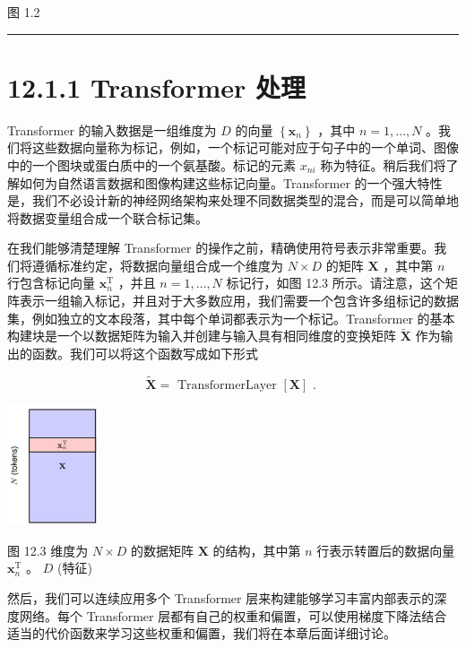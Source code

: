 \documentclass[10pt]{report}
\newcommand{\HRule}{\begin{center}\rule{0.9\linewidth}{0.2mm}\end{center}}
\begin{document}
图 1.2

\HRule

\section*{12.1.1 Transformer 处理}

Transformer 的输入数据是一组维度为 \(D\) 的向量 \(\left\{  {\mathbf{x}}_{n}\right\}\) ，其中 \(n = 1,\ldots ,N\) 。我们将这些数据向量称为标记，例如，一个标记可能对应于句子中的一个单词、图像中的一个图块或蛋白质中的一个氨基酸。标记的元素 \({x}_{ni}\) 称为特征。稍后我们将了解如何为自然语言数据和图像构建这些标记向量。Transformer 的一个强大特性是，我们不必设计新的神经网络架构来处理不同数据类型的混合，而是可以简单地将数据变量组合成一个联合标记集。

在我们能够清楚理解 Transformer 的操作之前，精确使用符号表示非常重要。我们将遵循标准约定，将数据向量组合成一个维度为 \(N \times  D\) 的矩阵 \(\mathbf{X}\) ，其中第 \(n\) 行包含标记向量 \({\mathbf{x}}_{n}^{\mathrm{T}}\) ，并且 \(n = 1,\ldots ,N\) 标记行，如图 12.3 所示。请注意，这个矩阵表示一组输入标记，并且对于大多数应用，我们需要一个包含许多组标记的数据集，例如独立的文本段落，其中每个单词都表示为一个标记。Transformer 的基本构建块是一个以数据矩阵为输入并创建与输入具有相同维度的变换矩阵 \(\widetilde{\mathbf{X}}\) 作为输出的函数。我们可以将这个函数写成如下形式

\[
\widetilde{\mathbf{X}} = \text{ TransformerLayer }\left\lbrack  \mathbf{X}\right\rbrack  \text{ . } \tag{12.1}
\]

\begin{center}
\includegraphics[max width=0.2\textwidth]{images/0194e279-9b28-703a-88f4-c3ac21e2010d_380_1076_344_303_404_0.jpg}
\end{center}
\hspace*{3em} 

图 12.3 维度为 \(N \times  D\) 的数据矩阵 \(\mathbf{X}\) 的结构，其中第 \(n\) 行表示转置后的数据向量 \({\mathbf{x}}_{n}^{\mathrm{T}}\) 。 \(D\) (特征)

然后，我们可以连续应用多个 Transformer 层来构建能够学习丰富内部表示的深度网络。每个 Transformer 层都有自己的权重和偏置，可以使用梯度下降法结合适当的代价函数来学习这些权重和偏置，我们将在本章后面详细讨论。
\end{document}
